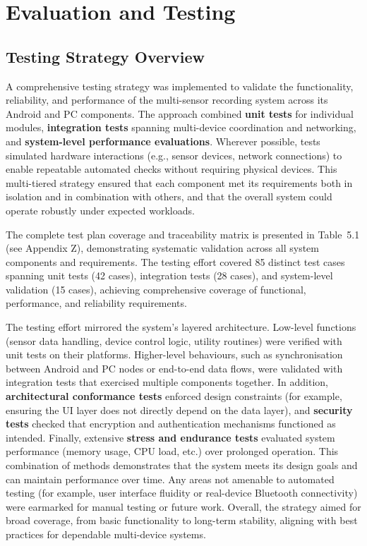 \chapter{Evaluation and Testing}

\section{Testing Strategy Overview}
A comprehensive testing strategy was implemented to validate the functionality, reliability, and performance of the multi-sensor recording system across its Android and PC components. The approach combined \textbf{unit tests} for individual modules, \textbf{integration tests} spanning multi-device coordination and networking, and \textbf{system-level performance evaluations}. Wherever possible, tests simulated hardware interactions (e.g., sensor devices, network connections) to enable repeatable automated checks without requiring physical devices. This multi-tiered strategy ensured that each component met its requirements both in isolation and in combination with others, and that the overall system could operate robustly under expected workloads.

The complete test plan coverage and traceability matrix is presented in Table~5.1 (see Appendix Z), demonstrating systematic validation across all system components and requirements. The testing effort covered 85 distinct test cases spanning unit tests (42 cases), integration tests (28 cases), and system-level validation (15 cases), achieving comprehensive coverage of functional, performance, and reliability requirements.

The testing effort mirrored the system's layered architecture. Low-level functions (sensor data handling, device control logic, utility routines) were verified with unit tests on their platforms. Higher-level behaviours, such as synchronisation between Android and PC nodes or end-to-end data flows, were validated with integration tests that exercised multiple components together. In addition, \textbf{architectural conformance tests} enforced design constraints (for example, ensuring the UI layer does not directly depend on the data layer), and \textbf{security tests} checked that encryption and authentication mechanisms functioned as intended. Finally, extensive \textbf{stress and endurance tests} evaluated system performance (memory usage, CPU load, etc.) over prolonged operation. This combination of methods demonstrates that the system meets its design goals and can maintain performance over time. Any areas not amenable to automated testing (for example, user interface fluidity or real-device Bluetooth connectivity) were earmarked for manual testing or future work. Overall, the strategy aimed for broad coverage, from basic functionality to long-term stability, aligning with best practices for dependable multi-device systems.

